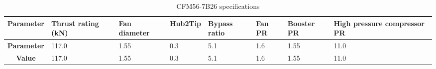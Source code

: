 \begin{table}[h!]
  \centering
  \begin{tabularx}{\textwidth}{||c|X|X|X|X|X|X|X||}
  \hline
    \cellcolor{gray!20}\textbf{Parameter} & \cellcolor{gray!20}\textbf{Thrust rating (kN)} & \cellcolor{gray!20}\textbf{Fan diameter} & \cellcolor{gray!20}\textbf{Hub2Tip} & \cellcolor{gray!20}\textbf{Bypass ratio} & \cellcolor{gray!20}\textbf{Fan PR} & \cellcolor{gray!20}\textbf{Booster PR} & \cellcolor{gray!20}\textbf{High pressure compressor PR} \\ [0.5ex]
  \hline\hline
\centering
    \cellcolor{gray!20}\textbf{Parameter} & 117.0 & 1.55 & 0.3 & 5.1 & 1.6 & 1.55 & 11.0 \\
  \hline
    \cellcolor{gray!20}\textbf{Value} & 117.0 & 1.55 & 0.3 & 5.1 & 1.6 & 1.55 & 11.0 \\
  \hline
  \end{tabularx}
  \caption{CFM56-7B26 specifications}
  \label{tab:specs}
\end{table}
